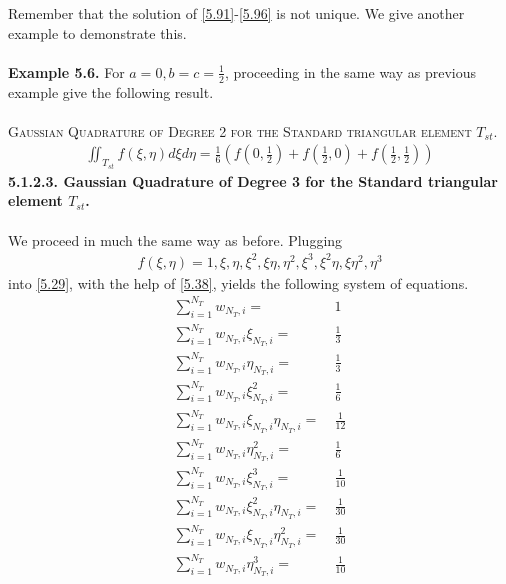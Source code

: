 \documentclass[a4paper]{article}
\numberwithin{equation}{section}
\begin{document}
Remember that the solution of \eqref{5.91}-\eqref{5.96} is not unique. We give another example to demonstrate this.\\
\\
\textbf{Example 5.6.} For $a = 0,b = c = \frac{1}{2}$, proceeding in the same way as previous example give the following result.\\
\\
\textsc{Gaussian Quadrature of Degree 2 for the Standard triangular element $T_{st}$.}
\begin{align}
\iint_{{T_{st}}} {f\left( {\xi ,\eta } \right)d\xi d\eta } = \frac{1}{6}\left( {f\left( {0,\frac{1}{2}} \right) + f\left( {\frac{1}{2},0} \right) + f\left( {\frac{1}{2},\frac{1}{2}} \right)} \right)
\end{align}
\textbf{5.1.2.3. Gaussian Quadrature of Degree 3 for   the Standard triangular element $T_{st}$.}\\
\\
We proceed in much the same way as before. Plugging
\begin{align}
 f\left( {\xi ,\eta } \right) = 1,\xi ,\eta ,{\xi ^2},\xi \eta ,{\eta ^2},{\xi ^3},{\xi ^2}\eta ,\xi {\eta ^2},{\eta ^3}
\end{align}
into \eqref{5.29}, with the help of \eqref{5.38}, yields the following system of equations.
\begin{align}
\label{5.173}
\sum\limits_{i = 1}^{{N_T}} {{w_{{N_T},i}}} =&\ 1\\
\sum\limits_{i = 1}^{{N_T}} {{w_{{N_T},i}}{\xi _{{N_T},i}}}  =&\ \frac{1}{3}\\
\sum\limits_{i = 1}^{{N_T}} {{w_{{N_T},i}}{\eta _{{N_T},i}}}  =&\ \frac{1}{3}\\
\sum\limits_{i = 1}^{{N_T}} {{w_{{N_T},i}}\xi _{{N_T},i}^2}  =&\ \frac{1}{6}\\
\sum\limits_{i = 1}^{{N_T}} {{w_{{N_T},i}}{\xi _{{N_T},i}}{\eta _{{N_T},i}}}  =&\ \frac{1}{{12}}\\
\sum\limits_{i = 1}^{{N_T}} {{w_{{N_T},i}}\eta _{{N_T},i}^2}  =&\ \frac{1}{6}\\
\sum\limits_{i = 1}^{{N_T}} {{w_{{N_T},i}}\xi _{{N_T},i}^3}  =&\ \frac{1}{{10}}\\
\sum\limits_{i = 1}^{{N_T}} {{w_{{N_T},i}}\xi _{{N_T},i}^2{\eta _{{N_T},i}}}  =&\ \frac{1}{{30}}\\
\sum\limits_{i = 1}^{{N_T}} {{w_{{N_T},i}}{\xi _{{N_T},i}}\eta _{{N_T},i}^2}  =&\ \frac{1}{{30}}\\
\sum\limits_{i = 1}^{{N_T}} {{w_{{N_T},i}}\eta _{{N_T},i}^3}  =&\ \frac{1}{{10}} \label{5.182}
\end{align}
\end{document}
